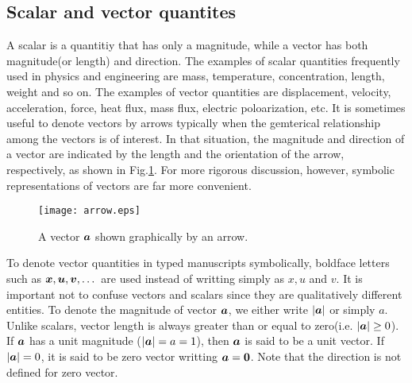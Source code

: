 \documentclass[10pt,a4j]{article}
\begin{document}
\subsection{Scalar and vector quantites}
A scalar is a quantitiy that has only a magnitude, while a vector has 
both magnitude(or length) and direction.
The examples of scalar quantities frequently used in physics and engineering 
are mass, temperature, concentration, length, weight and so on.
The examples of vector quantities are displacement, velocity, acceleration, 
force, heat flux, mass flux, electric poloarization, etc. 
It is sometimes useful to denote vectors by arrows typically when 
the gemterical relationship among the vectors is of interest.
In that situation, the magnitude and direction of a vector 
are indicated by the length and the orientation of the arrow, 
respectively, as shown in Fig.\ref{fig:fig1_1}. 
For more rigorous discussion, however, symbolic representations 
of vectors are far more convenient. 
\begin{figure}[h]
	\begin{center}
	\texttt{[image: arrow.eps]} 
	\end{center}
	\caption{A vector $\mbox{\boldmath $a$}$ shown graphically by an arrow.} 
	\label{fig:fig1_1}
\end{figure}
To denote vector quantities in typed manuscripts symbolically, boldface letters such 
as $\mbox{\boldmath $x$},\mbox{\boldmath $u$},\mbox{\boldmath $v$},\dots$ are used instead of writting simply as $x, u$ and $v$.
It is important not to confuse vectors and scalars since they are qualitatively different entities.
To denote the magnitude of vector $\mbox{\boldmath $a$}$, we either write $|\mbox{\boldmath $a$}|$ or simply $a$.
Unlike scalars, vector length is always greater than or equal to zero(i.e. $|\mbox{\boldmath $a$}| \geq 0$).
If $\mbox{\boldmath $a$}$ has a unit magnitude ($|\mbox{\boldmath $a$}|=a=1$), then $\mbox{\boldmath $a$}$ is said to be a unit vector. 
If $|\mbox{\boldmath $a$}|=0$, it is said to be zero vector writting $\mbox{\boldmath $a$}=\mbox{\boldmath $0$}$. 
Note that the direction is not defined for zero vector.
\end{document}
